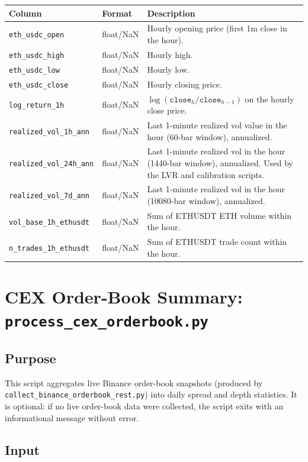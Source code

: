 \documentclass[11pt,a4paper]{article}
\begin{document}
\begin{xltabular}{\linewidth}{L{4.5cm}L{3.0cm}Y}
\toprule
\textbf{Column} & \textbf{Format} & \textbf{Description} \\
\midrule
\texttt{eth\_usdc\_open} & float/NaN & Hourly opening price (first 1m close
  in the hour). \\
\texttt{eth\_usdc\_high} & float/NaN & Hourly high. \\
\texttt{eth\_usdc\_low} & float/NaN & Hourly low. \\
\texttt{eth\_usdc\_close} & float/NaN & Hourly closing price. \\
\texttt{log\_return\_1h} & float/NaN & $\log(\texttt{close}_h /
  \texttt{close}_{h-1})$ on the hourly close price. \\
\texttt{realized\_vol\_1h\_ann} & float/NaN & Last 1-minute realized vol
  value in the hour (60-bar window), annualized. \\
\texttt{realized\_vol\_24h\_ann} & float/NaN & Last 1-minute realized vol
  in the hour (1440-bar window), annualized. Used by the LVR and
  calibration scripts. \\
\texttt{realized\_vol\_7d\_ann} & float/NaN & Last 1-minute realized vol
  in the hour (10080-bar window), annualized. \\
\texttt{vol\_base\_1h\_ethusdt} & float/NaN & Sum of ETHUSDT ETH volume
  within the hour. \\
\texttt{n\_trades\_1h\_ethusdt} & float/NaN & Sum of ETHUSDT trade count
  within the hour. \\
\bottomrule
\end{xltabular}

\section{CEX Order-Book Summary: \texttt{process\_cex\_orderbook.py}}
\label{sec:cexob}

\subsection{Purpose}

This script aggregates live Binance order-book snapshots (produced by
\texttt{collect\_binance\_orderbook\_rest.py}) into daily spread and
depth statistics. It is optional: if no live order-book data were
collected, the script exits with an informational message without error.

\subsection{Input}
\end{document}
